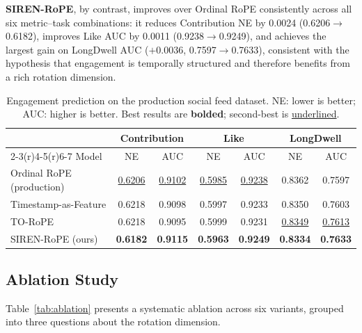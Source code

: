 \documentclass{article}
\begin{document}
\textbf{SIREN-RoPE}, by contrast, improves over Ordinal RoPE consistently
across all six metric--task combinations: it reduces Contribution NE by
0.0024 (0.6206$\to$0.6182), improves Like AUC by 0.0011
(0.9238$\to$0.9249), and achieves the largest gain on LongDwell AUC
($+$0.0036, 0.7597$\to$0.7633), consistent with the hypothesis that
engagement is temporally structured and therefore benefits from a rich rotation dimension.

\begin{table}[t]
  \caption{Engagement prediction on the production social feed dataset.
    NE: lower is better; AUC: higher is better. Best results are
    \textbf{bolded}; second-best is \underline{underlined}.}
  \label{tab:main}
  \centering
  \small
  \begin{tabular}{lcccccc}
    \toprule
    & \multicolumn{2}{c}{Contribution} & \multicolumn{2}{c}{Like}
    & \multicolumn{2}{c}{LongDwell} \\
    \cmidrule(r){2-3}\cmidrule(r){4-5}\cmidrule(r){6-7}
    Model & NE & AUC & NE & AUC & NE & AUC \\
    \midrule
    Ordinal RoPE (production) & \underline{0.6206} & \underline{0.9102} & \underline{0.5985} & \underline{0.9238} & 0.8362 & 0.7597 \\
    Timestamp-as-Feature      & 0.6218 & 0.9098 & 0.5997 & 0.9233 & 0.8350 & 0.7603 \\
    TO-RoPE                   & 0.6218 & 0.9095 & 0.5999 & 0.9231 & \underline{0.8349} & \underline{0.7613} \\
    \midrule
    SIREN-RoPE (ours)         & \textbf{0.6182} & \textbf{0.9115} & \textbf{0.5963} & \textbf{0.9249} & \textbf{0.8334} & \textbf{0.7633} \\
    \bottomrule
  \end{tabular}
\end{table}

\subsection{Ablation Study}

Table~\ref{tab:ablation} presents a systematic ablation across six variants,
grouped into three questions about the rotation dimension.
\end{document}

